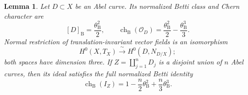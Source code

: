 \documentclass[11pt]{article}
\newtheorem{lemma}[theorem]{Lemma}
\numberwithin{equation}{section}
\begin{document}
\begin{lemma}\label{p3sw:abel-character}
Let \(D\subset X\) be an Abel curve.  Its normalized Betti class and
Chern character are
\[
 [D]_{\mathrm B}=\frac{\theta_{\mathrm B}^2}{2},
 \qquad
 \operatorname{ch}_{\mathrm B}(\mathcal O_D)
   =\frac{\theta_{\mathrm B}^2}{2}
      -\frac{\theta_{\mathrm B}^3}{3}.
\]
Normal restriction of translation-invariant vector fields is an
isomorphism
\[
 H^0(X,T_X)\xrightarrow{\ \sim\ }H^0(D,N_{D/X});
\]
both spaces have dimension three.  If
\(Z=\coprod_{j=1}^nD_j\) is a disjoint union of \(n\) Abel curves, then
its ideal satisfies the full normalized Betti identity
\begin{equation}\label{p3sw:invariant-betti-character}
 \operatorname{ch}_{\mathrm B}(I_Z)
 =1-\frac n2\theta_{\mathrm B}^2+\frac n3\theta_{\mathrm B}^3.
\end{equation}
\end{lemma}
\end{document}
